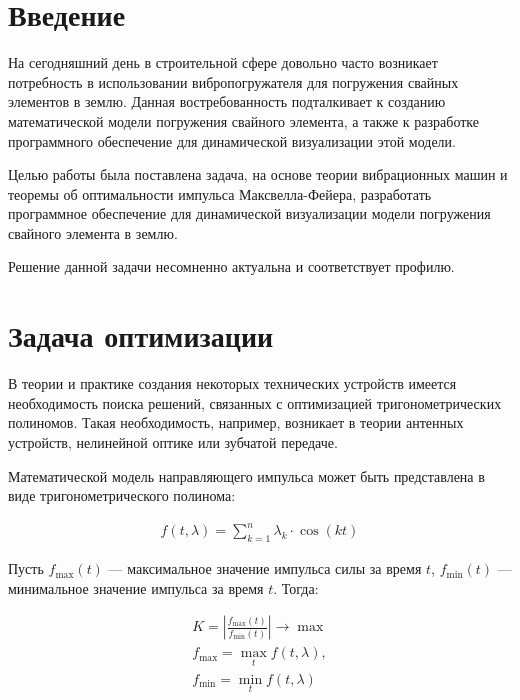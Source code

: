 \section*{Введение}

На сегодняшний день в строительной сфере довольно часто возникает потребность в использовании вибропогружателя для погружения свайных элементов в землю.
Данная востребованность подталкивает к созданию математической модели погружения свайного элемента,
а также к разработке программного обеспечение для динамической визуализации этой модели.

Целью работы была поставлена задача, на основе теории вибрационных машин и теоремы об оптимальности импульса Максвелла-Фейера,
разработать программное обеспечение для динамической визуализации модели погружения свайного элемента в землю.

Решение данной задачи несомненно актуальна и соответствует профилю.

\clearpage
\section{Задача оптимизации}

В теории и практике создания некоторых технических устройств имеется необходимость поиска решений, связанных с оптимизацией тригонометрических полиномов.
Такая необходимость, например, возникает в теории антенных устройств, нелинейной оптике или зубчатой передаче.

Математической модель направляющего импульса может быть представлена в виде тригонометрического полинома:

\begin{equation}\label{eq:harmonic_sum}
    \begin{gathered}
        f(t, \lambda) = \sum\limits_{k = 1}^n \lambda_k \cdot \cos(kt)
    \end{gathered}
\end{equation}

Пусть $f_{\max}(t)$ --- максимальное значение импульса силы за время $t$, $f_{\min}(t)$ --- минимальное значение импульса за время $t$. Тогда:

\begin{equation}\label{eq:optim}
    \begin{gathered}
        K = \left| \frac{f_{\max}(t)}{f_{\min}(t)} \right| \rightarrow \max \\
        f_{\max} = \max_t f(t, \lambda),\\
        f_{\min} = \min_t f(t, \lambda)
    \end{gathered}
\end{equation}

